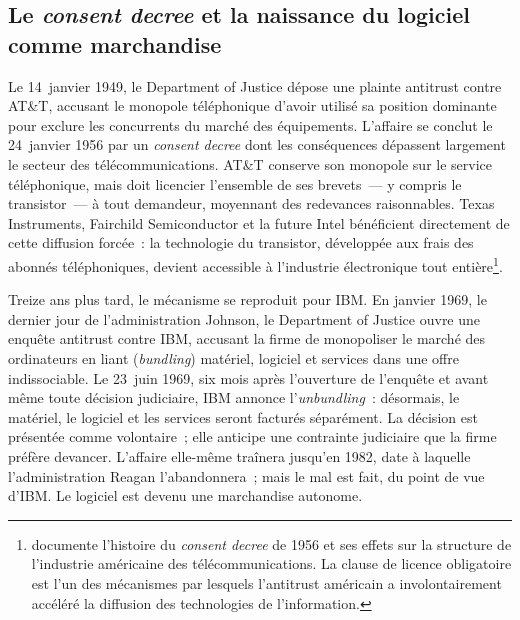 \subsection{Le \emph{consent decree} et la naissance du logiciel comme marchandise}\label{subsec:consent_decree}

%
Le 14~janvier 1949, le Department of Justice dépose une plainte antitrust contre AT\&T, accusant le monopole téléphonique d'avoir utilisé sa position dominante pour exclure les concurrents du marché des équipements. L'affaire se conclut le 24~janvier 1956 par un \emph{consent decree} dont les conséquences dépassent largement le secteur des télécommunications. AT\&T conserve son monopole sur le service téléphonique, mais doit licencier l'ensemble de ses brevets~--- y compris le transistor~--- à tout demandeur, moyennant des redevances raisonnables. Texas Instruments, Fairchild Semiconductor et la future Intel bénéficient directement de cette diffusion forcée~: la technologie du transistor, développée aux frais des abonnés téléphoniques, devient accessible à l'industrie électronique tout entière\footnote{\textcite{temin_fall_1987} documente l'histoire du \emph{consent decree} de 1956 et ses effets sur la structure de l'industrie américaine des télécommunications. La clause de licence obligatoire est l'un des mécanismes par lesquels l'antitrust américain a involontairement accéléré la diffusion des technologies de l'information.}.

%
Treize ans plus tard, le mécanisme se reproduit pour IBM. En janvier 1969, le dernier jour de l'administration Johnson, le Department of Justice ouvre une enquête antitrust contre IBM, accusant la firme de monopoliser le marché des ordinateurs en liant (\emph{bundling}) matériel, logiciel et services dans une offre indissociable. Le 23~juin 1969, six mois après l'ouverture de l'enquête et avant même toute décision judiciaire, IBM annonce l'\emph{unbundling}~: désormais, le matériel, le logiciel et les services seront facturés séparément. La décision est présentée comme volontaire~; elle anticipe une contrainte judiciaire que la firme préfère devancer. L'affaire elle-même traînera jusqu'en 1982, date à laquelle l'administration Reagan l'abandonnera~; mais le mal est fait, du point de vue d'IBM. Le logiciel est devenu une marchandise autonome.

